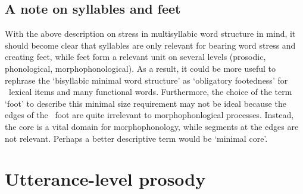 \subsection{A note on syllables and feet}\label{footedness}
With the above description on stress in multisyllabic word structure in mind, it should become clear that syllables are only relevant for bearing word stress and creating feet, while feet form a relevant unit on several levels (prosodic, phonological, morphophonological). As a result, it could be more useful to rephrase the ‘bisyllabic minimal word structure’ as ‘obligatory footedness’ for \PS\ lexical items and many functional words. Furthermore, the choice of the term ‘foot’ to describe this minimal size requirement may not be ideal because the edges of the \PS\ foot are quite irrelevant to morphophonlogical processes. Instead, the  core is a vital domain for morphophonology, while segments at the edges are not relevant. Perhaps a better descriptive term would be ‘minimal core’.


\section{Utterance-level prosody}\label{utteranceProsody}

